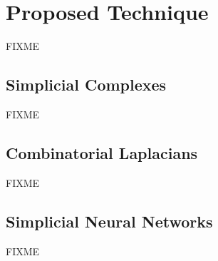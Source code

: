 \section{Proposed Technique}
FIXME

\subsection{Simplicial  Complexes}
FIXME

\subsection{Combinatorial Laplacians}
FIXME

\subsection{Simplicial Neural Networks}
FIXME